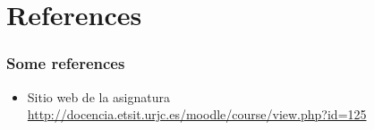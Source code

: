 \documentclass{beamer}
\begin{document}
\section{References}

\begin{frame}
\frametitle{Some references}

\begin{itemize}
\item Sitio web de la asignatura \\
  \url{http://docencia.etsit.urjc.es/moodle/course/view.php?id=125}

\end{itemize}

\end{frame}
\end{document}
